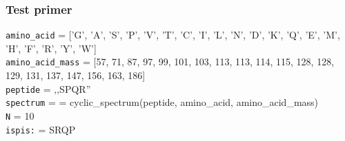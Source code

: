 

\subsubsection{Test primer}

\noindent\texttt{amino\_acid} = ['G', 'A', 'S', 'P', 'V', 'T', 'C', 'I', 'L', 'N', 'D', 'K', 'Q', 'E', 'M', 'H', 'F', 'R', 'Y', 'W']
\\
\texttt{amino\_acid\_mass} = [57, 71, 87, 97, 99, 101, 103, 113, 113, 114, 115, 128, 128, 129, 131, 137, 147, 156, 163, 186]
\\\texttt{peptide} = ‚‚SPQR''
\\\texttt{spectrum} =  = cyclic\_spectrum(peptide, amino\_acid, amino\_acid\_mass)
\\\texttt{N} = 10
\\\texttt{ispis:} = SRQP
 